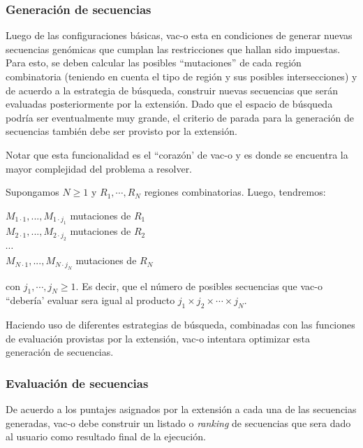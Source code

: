 \documentclass[10pt,a4paper]{article}
\begin{document}
  \subsubsection{Generaci\'on de secuencias}
  Luego de las configuraciones b\'asicas, vac-o esta en condiciones de generar nuevas secuencias gen\'omicas que cumplan las restricciones que hallan sido impuestas. Para esto, se deben calcular las posibles ``mutaciones'' de cada regi\'on combinatoria (teniendo en cuenta el tipo de regi\'on y sus posibles intersecciones) y de acuerdo a la estrategia de b\'usqueda, construir nuevas secuencias que ser\'an evaluadas posteriormente por la extensi\'on. Dado que el espacio de b\'usqueda podr\'ia ser eventualmente muy grande, el criterio de parada para la generaci\'on de secuencias tambi\'en debe ser provisto por la extensi\'on.

  Notar que esta funcionalidad es el ``coraz\'on' de vac-o y es donde se encuentra la mayor complejidad del problema a resolver. 

  Supongamos $N \geqslant 1$ y $R_{1}, \cdots, R_{N}$ regiones combinatorias. Luego, tendremos: \\
  \begin{center}    
    $M_{1\cdot1},..., M_{1\cdot j_{1}}$ mutaciones de $R_{1}$\\ 
    $M_{2\cdot1},..., M_{2\cdot j_{2}}$ mutaciones de $R_{2}$\\
    $\cdots$ \\
    $M_{N\cdot1},..., M_{N\cdot j_{N}}$ mutaciones de $R_{N}$   
  \end{center}
  con $j_{1}, \cdots, j_{N} \geqslant 1$. Es decir, que el n\'umero de posibles secuencias que vac-o ``deber\'ia' evaluar sera igual al producto $j_{1} \times j_{2} \times \cdots \times j_{N}$. 

  Haciendo uso de diferentes estrategias de b\'usqueda, combinadas con las funciones de evaluaci\'on provistas por la extensi\'on, vac-o intentara optimizar esta generaci\'on de secuencias.

  \subsubsection{Evaluaci\'on de secuencias}
  De acuerdo a los puntajes asignados por la extensi\'on a cada una de las secuencias generadas, vac-o debe construir un listado o \textit{ranking} de secuencias que sera dado al usuario como resultado final de la ejecuci\'on.
\end{document}
